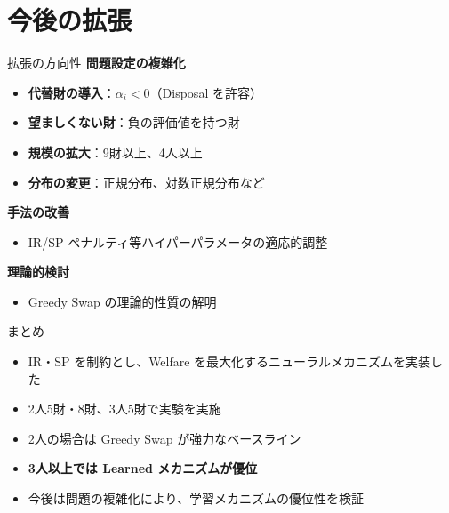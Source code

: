 \documentclass[aspectratio=169,12pt]{beamer}
\begin{document}
\section{今後の拡張}

\begin{frame}{拡張の方向性}
\textbf{問題設定の複雑化}
\begin{itemize}
    \item \textbf{代替財の導入}：$\alpha_i < 0$（Disposal を許容）
    \item \textbf{望ましくない財}：負の評価値を持つ財
    \item \textbf{規模の拡大}：9財以上、4人以上
    \item \textbf{分布の変更}：正規分布、対数正規分布など
\end{itemize}

\vspace{0.5cm}
\textbf{手法の改善}
\begin{itemize}
    \item IR/SP ペナルティ等ハイパーパラメータの適応的調整
\end{itemize}

\vspace{0.5cm}
\textbf{理論的検討}
\begin{itemize}
    \item Greedy Swap の理論的性質の解明
\end{itemize}
\end{frame}

\begin{frame}{まとめ}
\begin{itemize}
    \item IR・SP を制約とし、Welfare を最大化するニューラルメカニズムを実装した
    \item 2人5財・8財、3人5財で実験を実施
    \item 2人の場合は Greedy Swap が強力なベースライン
    \item \textbf{3人以上では Learned メカニズムが優位}
    \item 今後は問題の複雑化により、学習メカニズムの優位性を検証
\end{itemize}
\end{frame}

\end{document}
